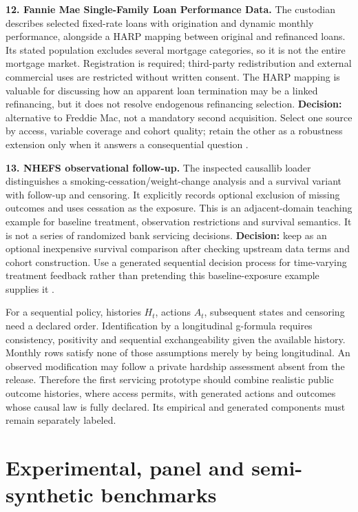 \textbf{12. Fannie Mae Single-Family Loan Performance Data.} The
custodian describes selected fixed-rate loans with origination and
dynamic monthly performance, alongside a HARP mapping between original
and refinanced loans. Its stated population excludes several mortgage
categories, so it is not the entire mortgage market. Registration is
required; third-party redistribution and external commercial uses are
restricted without written consent. The HARP mapping is valuable for
discussing how an apparent loan termination may be a linked refinancing,
but it does not resolve endogenous refinancing selection.
\textbf{Decision:} alternative to Freddie Mac, not a mandatory second
acquisition. Select one source by access, variable coverage and cohort
quality; retain the other as a robustness extension only when it answers
a consequential question \citep{pd15_fannie}.

\textbf{13. NHEFS observational follow-up.} The inspected causallib
loader distinguishes a smoking-cessation/weight-change analysis and a
survival variant with follow-up and censoring. It explicitly records
optional exclusion of missing outcomes and uses cessation as the
exposure. This is an adjacent-domain teaching example for baseline
treatment, observation restrictions and survival semantics. It is not a
series of randomized bank servicing decisions. \textbf{Decision:} keep
as an optional inexpensive survival comparison after checking upstream
data terms and cohort construction. Use a generated sequential decision
process for time-varying treatment feedback rather than pretending this
baseline-exposure example supplies it \citep{pd15_nhefs_pinned}.

For a sequential policy, histories \(H_t\), actions \(A_t\), subsequent
states and censoring need a declared order. Identification by a
longitudinal g-formula requires consistency, positivity and sequential
exchangeability given the available history. Monthly rows satisfy none
of those assumptions merely by being longitudinal. An observed
modification may follow a private hardship assessment absent from the
release. Therefore the first servicing prototype should combine
realistic public outcome histories, where access permits, with generated
actions and outcomes whose causal law is fully declared. Its empirical
and generated components must remain separately labeled.

\hypertarget{experimental-panel-and-semi-synthetic-benchmarks}{%
\section{Experimental, panel and semi-synthetic
benchmarks}\label{experimental-panel-and-semi-synthetic-benchmarks}}

